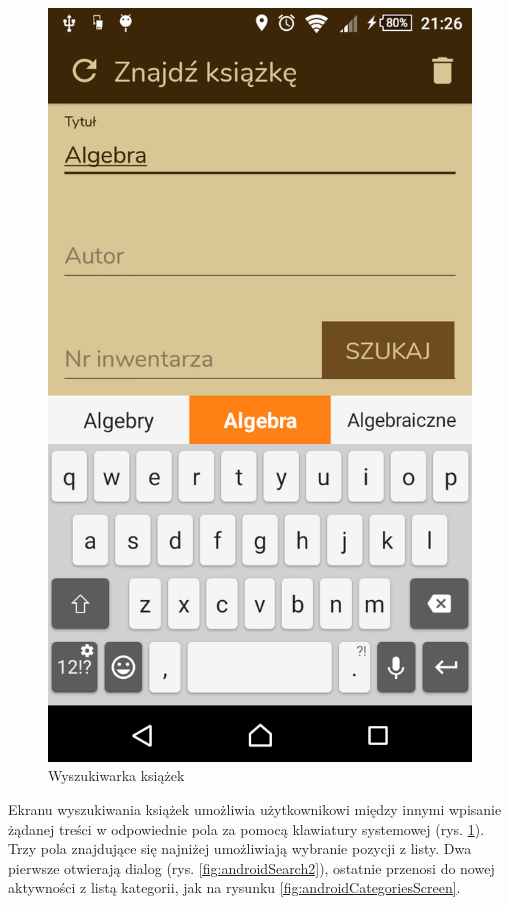 \documentclass[twoside]{projektInzynierskiMS}
\begin{document}
\begin{figure}[h]
  \centering
  \includegraphics[width=0.4\linewidth]{img/android/android2.png}
  \caption{Wyszukiwarka książek}
  \label{fig:searchScreen}
\end{figure}

Ekranu wyszukiwania książek umożliwia użytkownikowi między innymi wpisanie żądanej treści w odpowiednie pola za pomocą klawiatury systemowej (rys. \ref{fig:searchScreen}). Trzy pola znajdujące się najniżej umożliwiają wybranie pozycji z listy. Dwa pierwsze otwierają dialog (rys. \ref{fig:androidSearch2}), ostatnie przenosi do nowej aktywności z listą kategorii, jak na rysunku \ref{fig:androidCategoriesScreen}.
\end{document}
